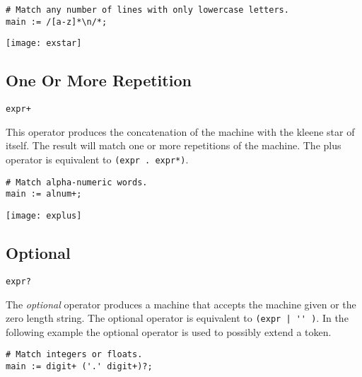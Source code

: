 \documentclass[letterpaper,11pt,oneside]{book}
\newcommand{\verbspace}{\vspace{10pt}}
\newcommand{\graphspace}{\vspace{10pt}}
\newenvironment{inline_code}{\def\baselinestretch{1}\vspace{12pt}\small}{}
\begin{document}
\begin{inline_code}
\begin{verbatim}
# Match any number of lines with only lowercase letters.
main := /[a-z]*\n/*;
\end{verbatim}
\end{inline_code}

\graphspace
\begin{center}
\texttt{[image: exstar]}
\end{center}
\graphspace

\subsection{One Or More Repetition}

\verb|expr+|
\verbspace

This operator produces the concatenation of the machine with the kleene star of
itself. The result will match one or more repetitions of the machine. The plus
operator is equivalent to \verb|(expr . expr*)|.  

\begin{inline_code}
\begin{verbatim}
# Match alpha-numeric words.
main := alnum+;
\end{verbatim}
\end{inline_code}

\graphspace
\begin{center}
\texttt{[image: explus]}
\end{center}
\graphspace

\subsection{Optional}

\verb|expr?|
\verbspace

The {\em optional} operator produces a machine that accepts the machine
given or the zero length string. The optional operator is equivalent to
\verb/(expr | '' )/. In the following example the optional operator is used to
possibly extend a token.

\begin{inline_code}
\begin{verbatim}
# Match integers or floats.
main := digit+ ('.' digit+)?;
\end{verbatim}
\end{inline_code}
\end{document}
